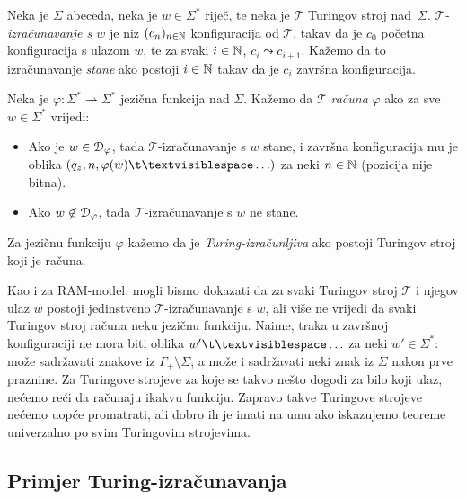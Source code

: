 \begin{definicija}\label{def:Tcomputefi}
Neka je $\Sigma$ abeceda, neka je $w\in\Sigma^*$ riječ, te neka je $\mathcal T$ Turingov stroj nad~$\Sigma$. \emph{$\mathcal T$\!-izračunavanje s $w$} je niz $(c_n)_{n\in{\mathbb N}}$ konfiguracija od $\mathcal T$, takav da je $c_0$ početna konfiguracija s ulazom $w$, te za svaki $i\in{\mathbb N}$, $c_i\leadsto c_{i+1}$. Kažemo da to izračunavanje \emph{stane} ako postoji $i\in{\mathbb N}$ takav da je $c_i$ završna konfiguracija.

Neka je $\varphi\colon\Sigma^*\rightharpoonup\Sigma^*$ jezična funkcija nad $\Sigma$. Kažemo da $\mathcal T$ \emph{računa} $\varphi$ ako za sve $w\in\Sigma^*$ vrijedi:
\begin{itemize}
    \item Ako je $w\in\mathcal D_{\varphi}$, tada $\mathcal T$-izračunavanje s $w$ stane, i završna konfiguracija mu je oblika $(q_z,n,\varphi(w)\bl\ldots)$ za neki $n\in{\mathbb N}$ (pozicija nije bitna).
    \item Ako $w\not\in\mathcal D_{\varphi}$, tada $\mathcal T$-izračunavanje s $w$ ne stane.
\end{itemize}
Za jezičnu funkciju $\varphi$ kažemo da je \emph{Turing-izračunljiva} ako postoji Turingov stroj koji je računa.
\end{definicija}

Kao i za RAM-model, mogli bismo dokazati da za svaki Turingov stroj $\mathcal T$ i njegov ulaz $w$ postoji jedinstveno $\mathcal T$-izračunavanje s $w$, ali više ne vrijedi da svaki Turingov stroj računa neku jezičnu funkciju. Naime, traka u završnoj konfiguraciji ne mora biti oblika $w'\bl\ldots$ za neki $w'\in\Sigma^*$: može sadržavati znakove iz $\Gamma_+\!\setminus\Sigma$, a može i sadržavati neki znak iz $\Sigma$ nakon prve praznine. Za Turingove strojeve za koje se takvo nešto dogodi za bilo koji ulaz, nećemo reći da računaju ikakvu funkciju. Zapravo takve Turingove strojeve nećemo uopće promatrati, ali dobro ih je imati na umu ako iskazujemo teoreme univerzalno po svim Turingovim strojevima.

\subsection{Primjer Turing-izračunavanja}

